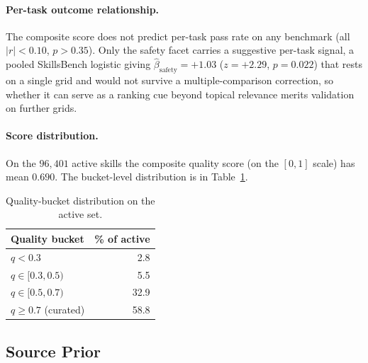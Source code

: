 \paragraph{Per-task outcome relationship.}
The composite score does not predict per-task pass rate on any
benchmark (all $|r|<0.10$, $p>0.35$).  Only the safety facet
carries a suggestive per-task signal, a pooled SkillsBench logistic
giving $\hat{\beta}_{\mathrm{safety}}{=}+1.03$ ($z{=}+2.29$,
$p{=}0.022$) that rests on a single grid and would not survive a
multiple-comparison correction, so whether it can serve as a
ranking cue beyond topical relevance merits validation on further
grids.

\paragraph{Score distribution.}
On the $96{,}401$ active skills the composite quality score
(on the $[0,1]$ scale) has mean $0.690$.  The bucket-level
distribution is in Table~\ref{tab:q-dist}.

\begin{table}[!ht]
\centering\small
\setlength{\tabcolsep}{4pt}
\begin{tabular}{@{}lr@{}}
\toprule
Quality bucket          & \% of active \\
\midrule
$q < 0.3$               &  2.8 \\
$q \in [0.3, 0.5)$      &  5.5 \\
$q \in [0.5, 0.7)$      & 32.9 \\
$q \geq 0.7$ (curated)  & 58.8 \\
\bottomrule
\end{tabular}
\caption{Quality-bucket distribution on the active set.}
\label{tab:q-dist}
\end{table}

\subsection{Source Prior}
\label{app:source-prior}

